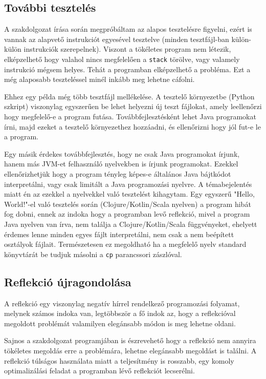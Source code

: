 \subsection{További tesztelés}

A szakdolgozat írása során megpróbáltam az alapos tesztelésre figyelni, ezért is vannak az alapvető instrukciót egyesével tesztelve (minden tesztfájl-ban külön-külön instrukciók szerepelnek). Viszont a tökéletes program nem létezik, elképzelhető hogy valahol nincs megfelelően a \lstinline{stack} törölve, vagy valamely instrukció mégsem helyes. Tehát a programban elképzelhető a probléma. Ezt a még alaposabb teszteléssel minél inkább meg lehetne cáfolni.

Ehhez egy példa még több tesztfájl mellékelése. A tesztelő környezetbe (Python szkript) viszonylag egyszerűen be lehet helyezni új teszt fájlokat, amely leellenőrzi hogy megfelelő-e a program futása. Továbbfejlesztésként lehet Java programokat írni, majd ezeket a tesztelő környezethez hozzáadni, és ellenőrizni hogy jól fut-e le a program.

Egy másik érdekes továbbfejlesztés, hogy ne csak Java programokat írjunk, hanem más JVM-et felhasználó nyelvekben is írjunk programokat. Ezekkel ellenőrizhetjük hogy a program tényleg képes-e általános Java bájtkódot interpretálni, vagy csak limitált a Java programozási nyelvre. A témabejelentés miatt én az ezekkel a nyelvekkel való tesztelést kihagytam. Egy egyszerű "Hello, World!"-el való tesztelés során (Clojure/Kotlin/Scala nyelven) a program hibát fog dobni, ennek az indoka hogy a programban levő reflekció, mivel a program Java nyelven van írva, nem találja a Clojure/Kotlin/Scala függvényeket, ehelyett érdemes lenne minden egyes fájlt interpretálni, nem csak a nem beépített osztályok fájlait. Természetesen ez megoldható ha a megfelelő nyelv standard könyvtárát be tudjuk másolni a \lstinline{cp} parancssori zászlóval.

\subsection{Reflekció újragondolása}

A reflekció egy viszonylag negatív hírrel rendelkező programozási folyamat, melynek számos indoka van, legtöbbször a fő indok az, hogy a reflekcióval megoldott problémát valamilyen elegánsabb módon is meg lehetne oldani.

Sajnos a szakdolgozat programjában is észrevehető hogy a reflekció nem annyira tökéletes megoldás erre a problémára, lehetne elegánsabb megoldást is találni. A reflekció túlságos használata miatt a teljesítmény is rosszabb, egy komoly optimalizálási feladat a programban lévő reflekciót lecserélni.

